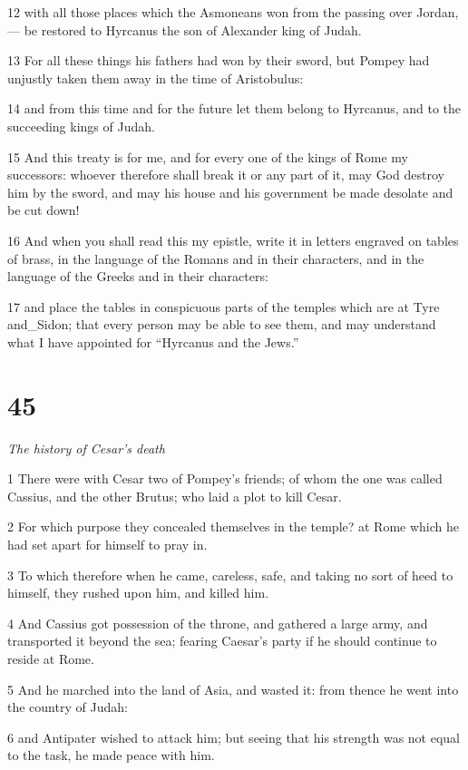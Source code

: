 12 with all those places which the Asmoneans won from the passing over Jordan,— be restored to Hyrcanus the son of Alexander king of Judah. 

13 For all these things his fathers had won by their sword, but Pompey had unjustly taken them away in the time of Aristobulus: 

14 and from this time and for the future let them belong to Hyrcanus, and to the succeeding kings of Judah. 

15 And this treaty is for me, and for every one of the kings of Rome my successors: whoever therefore shall break it or any part of it, may God destroy him by the sword, and may his house and his government be made desolate and be cut down! 

16 And when you shall read this my epistle, write it in letters engraved on tables of brass, in the language of the Romans and in their characters, and in the language of the Greeks and in their characters: 

17 and place the tables in conspicuous parts of the temples which are at Tyre and_Sidon; that every person may be able to see them, and may understand what I have appointed for “Hyrcanus and the Jews.” 

\chapter{45}

\par \textit{The history of Cesar’s death}

1 There were with Cesar two of Pompey’s friends; of whom the one was called Cassius, and the other Brutus; who laid a plot to kill Cesar. 

2 For which purpose they concealed themselves in the temple? at Rome which he had set apart for himself to pray in. 

3 To which therefore when he came, careless, safe, and taking no sort of heed to himself, they rushed upon him, and killed him. 

4 And Cassius got possession of the throne, and gathered a large army, and transported it beyond the sea; fearing Caesar’s party if he should continue to reside at Rome. 

5 And he marched into the land of Asia, and wasted it: from thence he went into the country of Judah: 

6 and Antipater wished to attack him; but seeing that his strength was not equal to the task, he made peace with him. 

